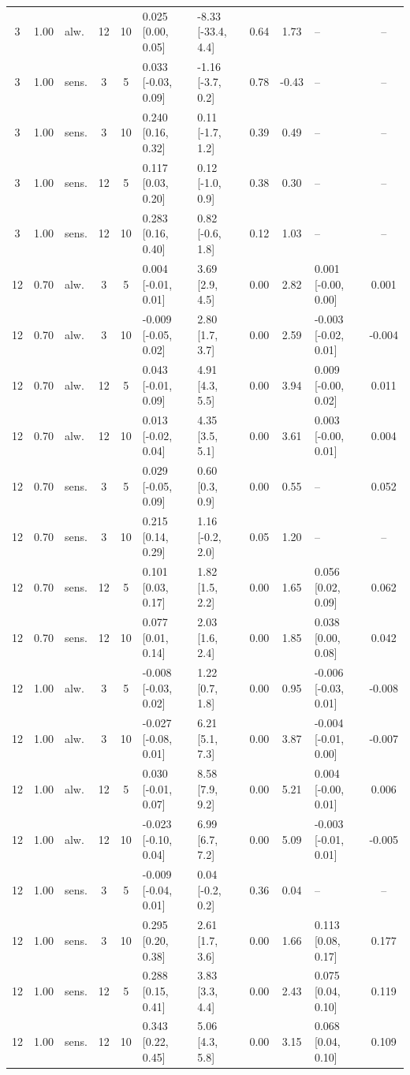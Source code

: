 \begin{scriptsize}
\begin{longtable}{cclcc l l c c l c}
3 & 1.00 & alw. & 12 & 10 & 0.025 [0.00, 0.05] & -8.33 [-33.4, 4.4] & 0.64 & 1.73 & -- & -- \\
3 & 1.00 & sens. & 3 & 5 & 0.033 [-0.03, 0.09] & -1.16 [-3.7, 0.2] & 0.78 & -0.43 & -- & -- \\
3 & 1.00 & sens. & 3 & 10 & 0.240 [0.16, 0.32] & 0.11 [-1.7, 1.2] & 0.39 & 0.49 & -- & -- \\
3 & 1.00 & sens. & 12 & 5 & 0.117 [0.03, 0.20] & 0.12 [-1.0, 0.9] & 0.38 & 0.30 & -- & -- \\
3 & 1.00 & sens. & 12 & 10 & 0.283 [0.16, 0.40] & 0.82 [-0.6, 1.8] & 0.12 & 1.03 & -- & -- \\
12 & 0.70 & alw. & 3 & 5 & 0.004 [-0.01, 0.01] & 3.69 [2.9, 4.5] & 0.00 & 2.82 & 0.001 [-0.00, 0.00] & 0.001 \\
12 & 0.70 & alw. & 3 & 10 & -0.009 [-0.05, 0.02] & 2.80 [1.7, 3.7] & 0.00 & 2.59 & -0.003 [-0.02, 0.01] & -0.004 \\
12 & 0.70 & alw. & 12 & 5 & 0.043 [-0.01, 0.09] & 4.91 [4.3, 5.5] & 0.00 & 3.94 & 0.009 [-0.00, 0.02] & 0.011 \\
12 & 0.70 & alw. & 12 & 10 & 0.013 [-0.02, 0.04] & 4.35 [3.5, 5.1] & 0.00 & 3.61 & 0.003 [-0.00, 0.01] & 0.004 \\
12 & 0.70 & sens. & 3 & 5 & 0.029 [-0.05, 0.09] & 0.60 [0.3, 0.9] & 0.00 & 0.55 & -- & 0.052 \\
12 & 0.70 & sens. & 3 & 10 & 0.215 [0.14, 0.29] & 1.16 [-0.2, 2.0] & 0.05 & 1.20 & -- & -- \\
12 & 0.70 & sens. & 12 & 5 & 0.101 [0.03, 0.17] & 1.82 [1.5, 2.2] & 0.00 & 1.65 & 0.056 [0.02, 0.09] & 0.062 \\
12 & 0.70 & sens. & 12 & 10 & 0.077 [0.01, 0.14] & 2.03 [1.6, 2.4] & 0.00 & 1.85 & 0.038 [0.00, 0.08] & 0.042 \\
12 & 1.00 & alw. & 3 & 5 & -0.008 [-0.03, 0.02] & 1.22 [0.7, 1.8] & 0.00 & 0.95 & -0.006 [-0.03, 0.01] & -0.008 \\
12 & 1.00 & alw. & 3 & 10 & -0.027 [-0.08, 0.01] & 6.21 [5.1, 7.3] & 0.00 & 3.87 & -0.004 [-0.01, 0.00] & -0.007 \\
12 & 1.00 & alw. & 12 & 5 & 0.030 [-0.01, 0.07] & 8.58 [7.9, 9.2] & 0.00 & 5.21 & 0.004 [-0.00, 0.01] & 0.006 \\
12 & 1.00 & alw. & 12 & 10 & -0.023 [-0.10, 0.04] & 6.99 [6.7, 7.2] & 0.00 & 5.09 & -0.003 [-0.01, 0.01] & -0.005 \\
12 & 1.00 & sens. & 3 & 5 & -0.009 [-0.04, 0.01] & 0.04 [-0.2, 0.2] & 0.36 & 0.04 & -- & -- \\
12 & 1.00 & sens. & 3 & 10 & 0.295 [0.20, 0.38] & 2.61 [1.7, 3.6] & 0.00 & 1.66 & 0.113 [0.08, 0.17] & 0.177 \\
12 & 1.00 & sens. & 12 & 5 & 0.288 [0.15, 0.41] & 3.83 [3.3, 4.4] & 0.00 & 2.43 & 0.075 [0.04, 0.10] & 0.119 \\
12 & 1.00 & sens. & 12 & 10 & 0.343 [0.22, 0.45] & 5.06 [4.3, 5.8] & 0.00 & 3.15 & 0.068 [0.04, 0.10] & 0.109 \\
\end{longtable}
\end{scriptsize}